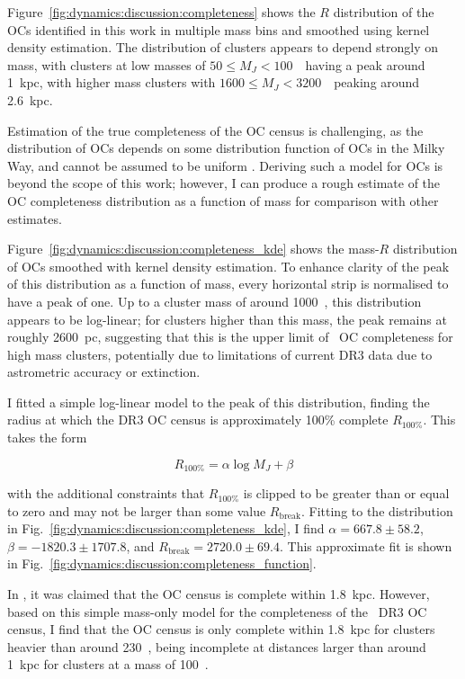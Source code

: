 Figure~\ref{fig:dynamics:discussion:completeness} shows the $R$ distribution of the OCs identified in this work in multiple mass bins and smoothed using kernel density estimation. The distribution of clusters appears to depend strongly on mass, with clusters at low masses of $50 \leq M_J < 100$~\MSun\ having a peak around 1~kpc, with higher mass clusters with $1600 \leq M_J < 3200$~\MSun\ peaking around 2.6~kpc.

Estimation of the true completeness of the OC census is challenging, as the distribution of OCs depends on some distribution function of OCs in the Milky Way, and cannot be assumed to be uniform \citep{anders_milky_2020}. Deriving such a model for OCs is beyond the scope of this work; however, I can produce a rough estimate of the OC completeness distribution as a function of mass for comparison with other estimates.

Figure~\ref{fig:dynamics:discussion:completeness_kde} shows the mass-$R$ distribution of OCs smoothed with kernel density estimation. To enhance clarity of the peak of this distribution as a function of mass, every horizontal strip is normalised to have a peak of one. Up to a cluster mass of around 1000~\MSun, this distribution appears to be log-linear; for clusters higher than this mass, the peak remains at roughly 2600~pc, suggesting that this is the upper limit of \gaia\ OC completeness for high mass clusters, potentially due to limitations of current DR3 data due to astrometric accuracy or extinction.

I fitted a simple log-linear model to the peak of this distribution, finding the radius at which the DR3 OC census is approximately 100\% complete $R_{100\%}$. This takes the form

\begin{equation}
    R_{100\%} = \alpha \log M_J + \beta
\end{equation}

\noindent
with the additional constraints that $R_{100\%}$ is clipped to be greater than or equal to zero and may not be larger than some value $R_\text{break}$. Fitting to the distribution in Fig.~\ref{fig:dynamics:discussion:completeness_kde}, I find $\alpha=667.8\pm58.2$, $\beta=-1820.3\pm1707.8$, and $R_\text{break}=2720.0\pm69.4$. This approximate fit is shown in Fig.~\ref{fig:dynamics:discussion:completeness_function}. 

In \cite{kharchenko_global_2013}, it was claimed that the OC census is complete within 1.8~kpc. However, based on this simple mass-only model for the completeness of the \gaia\ DR3 OC census, I find that the OC census is only complete within 1.8~kpc for clusters heavier than around 230~\MSun, being incomplete at distances larger than around 1~kpc for clusters at a mass of 100~\MSun.


